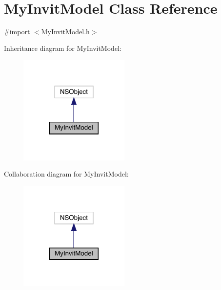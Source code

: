 \hypertarget{interface_my_invit_model}{}\section{My\+Invit\+Model Class Reference}
\label{interface_my_invit_model}


{\ttfamily \#import $<$My\+Invit\+Model.\+h$>$}



Inheritance diagram for My\+Invit\+Model\+:\nopagebreak
\begin{figure}[H]
\begin{center}
\leavevmode
\includegraphics[width=155pt]{interface_my_invit_model__inherit__graph}
\end{center}
\end{figure}


Collaboration diagram for My\+Invit\+Model\+:\nopagebreak
\begin{figure}[H]
\begin{center}
\leavevmode
\includegraphics[width=155pt]{interface_my_invit_model__coll__graph}
\end{center}
\end{figure}
